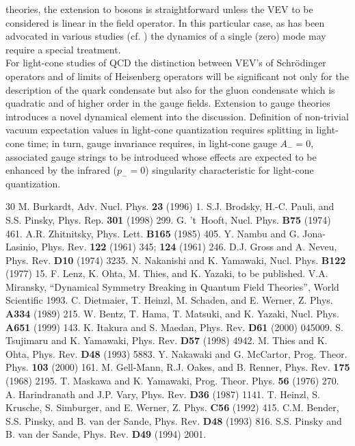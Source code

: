 \documentclass[a4paper,12pt]{article}
\begin{document}
theories, the extension to bosons is straightforward unless the VEV to be considered is linear
in the field operator. In this particular case, as has been advocated in various studies
(cf. \cite{Maskawa76,Harindranath87, Heinzl92,Bender93,Pinsky94}) the dynamics of a
single (zero) mode may require a special treatment. \\
For light-cone studies of QCD the distinction
between VEV's of Schr\"odinger operators and of limits of Heisenberg operators will be significant
not only for the description of the quark condensate but also for the gluon condensate which is
quadratic and of higher order in the gauge fields. Extension to gauge theories introduces a novel
dynamical element into the discussion.  Definition of non-trivial vacuum expectation values in
light-cone quantization requires splitting in light-cone time; in turn, gauge invariance requires, in
light-cone gauge $A_{-}=0$, associated gauge strings to be introduced whose effects are
expected to be enhanced by the infrared ($p_{-}=0$) singularity characteristic for light-cone
quantization.

\begin {thebibliography}{30}
M. Burkardt, Adv. Nucl. Phys. {\bf 23} (1996) 1.
S.J. Brodsky, H.-C. Pauli, and S.S. Pinsky,
Phys. Rep. {\bf 301} (1998) 299.
G. 't~Hooft, Nucl. Phys. {\bf B75} (1974) 461.
A.R. Zhitnitsky, Phys. Lett. {\bf B165} (1985) 405.
Y. Nambu and G. Jona-Lasinio, Phys. Rev. {\bf 122} (1961) 345; {\bf 124} (1961) 246.
D.J. Gross and A. Neveu, Phys. Rev. {\bf D10} (1974) 3235.
N. Nakanishi and K. Yamawaki,
Nucl. Phys. {\bf B122} (1977) 15.
F. Lenz, K. Ohta, M. Thies, and K. Yazaki, to be published.
V.A. Miransky, ``Dynamical Symmetry Breaking in Quantum Field Theories'', World Scientific 1993.
C. Dietmaier, T. Heinzl, M. Schaden, and E. Werner,
Z. Phys. {\bf A334} (1989) 215.
W. Bentz, T. Hama, T. Matsuki, and K. Yazaki,
Nucl. Phys. {\bf A651} (1999) 143.
K. Itakura and S. Maedan,
Phys. Rev. {\bf D61} (2000) 045009.
S. Tsujimaru and K. Yamawaki,
Phys. Rev. {\bf D57} (1998) 4942.
M. Thies and K. Ohta, Phys. Rev. {\bf D48} (1993) 5883.
Y. Nakawaki and G. McCartor, Prog. Theor. Phys. {\bf 103} (2000) 161.
M. Gell-Mann, R.J. Oakes, and B. Renner,
Phys. Rev. {\bf 175} (1968) 2195.
T. Maskawa and K. Yamawaki,
Prog. Theor. Phys. {\bf 56} (1976) 270.
A. Harindranath and J.P. Vary,
Phys. Rev. {\bf D36} (1987) 1141.
T. Heinzl, S. Krusche, S. Simburger, and E. Werner,
Z. Phys. {\bf C56} (1992) 415.
C.M. Bender, S.S. Pinsky, and B. van der Sande,
Phys. Rev. {\bf D48} (1993) 816.
S.S. Pinsky and B. van der Sande,
Phys. Rev. {\bf D49} (1994) 2001.
\end {thebibliography}
\end{document}
